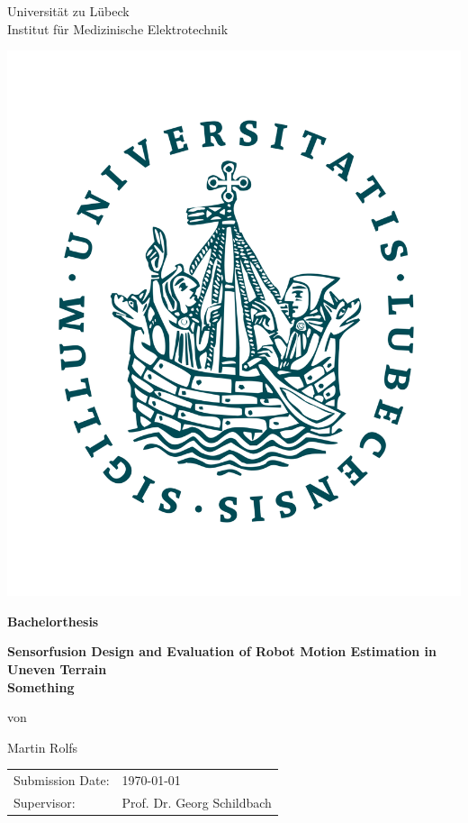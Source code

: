 \documentclass[12pt,oneside,bibtotoc,liststotoc]{scrbook}
\begin{document}
\thispagestyle{empty}
\begin{center}
\LARGE{Universität zu Lübeck}\\[3ex]
\large{Institut für Medizinische Elektrotechnik}\\[2ex]
\end{center}
\medskip

\begin{center}
\includegraphics[scale = 0.18]{images/Logo_Uni_Luebeck_1200dpi.png}
\vspace{1.5cm}

\textbf{\LARGE{Bachelorthesis}}
\medskip\par
\vspace{2cm}

\textbf{\Large{Sensorfusion Design and Evaluation of Robot Motion Estimation in Uneven Terrain}}\\
\textbf{\normalsize{Something}}
\bigskip\par
von \par
\large{Martin Rolfs}
\end{center}
\vspace{1cm}

\begin{tabular}{ll}
  Submission Date:  & \today \\
  Supervisor: & Prof. Dr. Georg Schildbach \\
\end{tabular}

\newpage

\thispagestyle{empty}

\renewcommand{\baselinestretch}{1.00}\normalsize

\setcounter{page}{1}
\renewcommand{\baselinestretch}{1}\normalsize

\newpage
\setcounter{page}{1}
\end{document}
